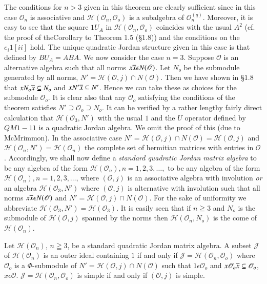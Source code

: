 The conditions for $n>3$ given in this theorem are clearly sufficient
since in this case $\mathscr{O}_n$ is associative and
$\mathscr{H}(\mathscr{O}_n,\mathscr{O}_o)$ is a subalgebra of
$\mathscr{O}^{(q)}_n$. Moreover, it is easy to see that the square
$1U_A$ in $\mathscr{H}(\mathscr{O}_n, \mathscr{O}_o)$ coincides with
the usual $A^{2}$ (cf. the proof of the\pageoriginale Corollary to
Theorem 1.5 (\S1.8)) and the conditions on the $e_{i}1[ii]$ hold. The
unique quadratic Jordan structure given in this case is that defined
by $BU_A=ABA$. We now consider the case $n=3$. Suppose $\mathscr{O}$
is an alternative algebra such that all norms $x\overline{x}\epsilon
N(\mathscr{O})$. Let $N_o$ be the submodule generated by all norms,
$N'=\mathscr{H}(\mathscr{O}, j)\cap N(\mathscr{O})$. Then we have
shown in \S $1.8$ that $xN_o\overline{x}\subseteq N_o$ and $xN'\overline{x} \subseteq
N'$. Hence we can take these as choices for the submodule
$\mathscr{O}_o$. It is clear also that any $\mathscr{O}_o$ satisfying
the conditions of the theorem satisfies
$N'\supseteq\mathscr{O}_o\supseteq N_o$. It can be verified by a
rather lengthy fairly direct calculation that
$\mathscr{H}(\mathscr{O}_3,N')$ with the usual $1$ and the $U$
operator defined by $QM 1-11$ is a quadratic Jordan algebra. We omit
the proof of this (due to McMrimmon). In the associative case
$N'=\mathscr{H}(\mathscr{O},j)\cap
N(\mathscr{O})=\mathscr{H}(\mathscr{O},j)$ and
$\mathscr{H}(\mathscr{O}_n,N')=\mathscr{H}(\mathscr{O}_n)$ the
complete set of hermitian matrices with entries in
$\mathscr{O}$. Accordingly, we shall now define a {\em standard
quadratic Jordan matrix algebra} to be any algebra of the form
$\mathscr{H}(\mathscr{O}_n),n=1,2,3,\ldots,$ to be any algebra of the
form $\mathscr{H}(\mathscr{O}_n), n=1,2,3,\ldots$, where
$(\mathscr{O},j)$ is an associative algebra with involution {\em or}
an algebra $\mathscr{H}(\mathscr{O}_3,N')$ where $(\mathscr{O}, j)$ is
alternative with involution such that all norms $x\overline{x}\epsilon
N(\mathscr{O})$ and $N'=\mathscr{H}(\mathscr{O},j)\cap
N(\mathscr{O})$. For the sake of uniformity we abbreviate
$\mathscr{H}(\mathscr{O}_3, N')=\mathscr{H}(\mathscr{O}_3)$. It is
easily seen that if $n\geqq 3$ and $N_o$ is the submodule of
$\mathscr{H}(\mathscr{O},j)$ spanned by the norms then
$\mathscr{H}(\mathscr{O}_n, N_o)$ is the come of $\mathscr{H}(\mathscr{O}_n)$.

\begin{thm}\label{c2:thm2}
Let \pageoriginale $\mathscr{H}(\mathscr{O}_n)$, $n\geqq 3$, be a
standard quadratic Jordan matrix algebra. A subset $\mathscr{J}$ of
$\mathscr{H}(\mathscr{O}_n)$ is an outer ideal containing $1$ if and
only if $\mathscr{J}=\mathscr{H}(\mathscr{O}_n, \mathscr{O}_o)$ where
$\mathscr{O}_o$ is a $\Phi$-submodule of $N'=\mathscr{H}(\mathscr{O},
j)\cap N(\mathscr{O})$ such that $1\epsilon \mathscr{O}_o$ and $x
\mathscr{O}_o\overline{x}\subseteq \mathscr{O}_o$, $x\epsilon
\mathscr{O}$. $\mathscr{J}=\mathscr{H}(\mathscr{O}_n, \mathscr{O}_o)$
is simple if and only if $(\mathscr{O},j)$ is simple.
\end{thm}

